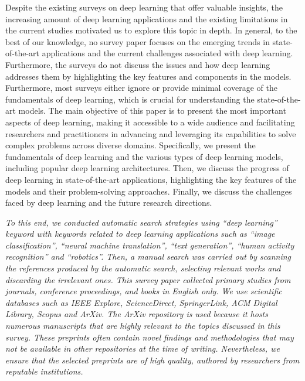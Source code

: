 \documentclass[preprint,12pt]{elsarticle}
\begin{document}
Despite the existing surveys on deep learning that offer valuable insights, the increasing amount of deep learning applications and the existing limitations in the current studies motivated us to explore this topic in depth. In general, to the best of our knowledge, no survey paper focuses on the emerging trends in state-of-the-art applications and the current challenges associated with deep learning. Furthermore, the surveys do not discuss the issues and how deep learning addresses them by highlighting the key features and components in the models. Furthermore, most surveys either ignore or provide minimal coverage of the fundamentals of deep learning, which is crucial for understanding the state-of-the-art models. The main objective of this paper is to present the most important aspects of deep learning, making it accessible to a wide audience and facilitating researchers and practitioners in advancing and leveraging its capabilities to solve complex problems across diverse domains. Specifically, we present the fundamentals of deep learning and the various types of deep learning models, including popular deep learning architectures. Then, we discuss the progress of deep learning in state-of-the-art applications, highlighting the key features of the models and their problem-solving approaches. Finally, we discuss the challenges faced by deep learning and the future research directions.

\emph{To this end, we conducted automatic search strategies using ``deep learning'' keyword with keywords related to deep learning applications such as ``image classification'', ``neural machine translation'', ``text generation'', ``human activity recognition'' and ``robotics''. Then, a manual search was carried out by scanning the references produced by the automatic search, selecting relevant works and discarding the irrelevant ones. This survey paper collected primary studies from journals, conference proceedings, and books in English only. We use scientific databases such as IEEE Explore, ScienceDirect, SpringerLink, ACM Digital Library, Scopus and ArXiv. The ArXiv repository is used because it hosts numerous manuscripts that are highly relevant to the topics discussed in this survey. These preprints often contain novel findings and methodologies that may not be available in other repositories at the time of writing. Nevertheless, we ensure that the selected preprints are of high quality, authored by researchers from reputable institutions.}
\end{document}
